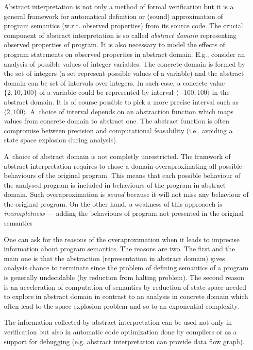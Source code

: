 \documentclass[a4paper, 12pt]{article}
\newcommand{\interval}[2]{\langle #1,#2 \rangle}
\begin{document}
Abstract interpretation is not only a method of formal verification but
it is a general framework for automatical definition or (sound) approximation of
program semantics (w.r.t. observed properties) from its source code.
The crucial component of abstract interpretation is so called
\emph{abstract domain} representing observed properties of program.
It is also necessary to model the effects of program statements
on observed properties in abstract domain.
E.g., consider an analysis of possible values of integer variables.
The concrete domain is formed by the set of integers (a set represent possible
values of a variable) and the abstract domain can be set of intervals over integers.
In such case, a concrete value $\{2,10,100\}$ of a variable could
be represented by interval $\interval{-100}{100}$ in the abstract domain.
It is of course possible to pick a more precise interval such as $\interval{2}{100}$.
A~choice of interval depends on an abstraction function
which maps values from concrete domain to abstract one.
The abstract function is often compromise between precision and computational
feasability (i.e., avoiding a state space explosion during analysis).

A~choice of abstract domain is not completly unrestricted.
The framwork of abstract interpretation requires to chose a domain
overaproximating all possible behaviours of the original program.
This means that each possible behaviour of the analysed program is included in
behaviours of the program in abstract domain.
Such overaproximation is \emph{sound} because it will not miss any
behaviour of the original program.
On the other hand, a weakness of this approaoch is \emph{incompletness}\,---\,
adding the behaviours of program not presented in the original semantics

One can ask for the reasons of the overaproximation when it leads to
imprecise information about program semantics.
The reasons are two.
The first and the main one is that the abstraction (representation in abstract domain) gives
analysis chance to terminate since the problem of defining semantics of a program is
generally undecidable (by reduction from halting problem).
The second reason is an acceleration of computation of semantics by reduction of state
space needed to explore in abstract domain in contrast to an analysis in concrete domain
which often lead to the space explosion problem and so to an exponential complexity.

The information collected by abstract interpretation can be used not only
in verification but also in automatic code optimization done by compilers
or as a support for debugging (e.g. abstract interpretation can provide data flow graph).
\end{document}
